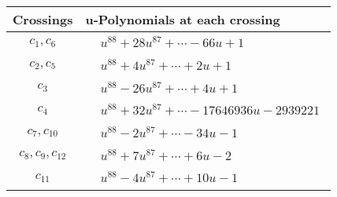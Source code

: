 \documentclass[1p]{elsarticle_modified}
\theoremstyle{definition}
\begin{document}
\begin{tabular}{m{50pt}|m{274pt}}
Crossings & \hspace{64pt}u-Polynomials at each crossing \\
\hline $$\begin{aligned}c_{1},c_{6}\end{aligned}$$&$\begin{aligned}
&u^{88}+28 u^{87}+\cdots-66 u+1
\end{aligned}$\\
\hline $$\begin{aligned}c_{2},c_{5}\end{aligned}$$&$\begin{aligned}
&u^{88}+4 u^{87}+\cdots+2 u+1
\end{aligned}$\\
\hline $$\begin{aligned}c_{3}\end{aligned}$$&$\begin{aligned}
&u^{88}-26 u^{87}+\cdots+4 u+1
\end{aligned}$\\
\hline $$\begin{aligned}c_{4}\end{aligned}$$&$\begin{aligned}
&u^{88}+32 u^{87}+\cdots-17646936 u-2939221
\end{aligned}$\\
\hline $$\begin{aligned}c_{7},c_{10}\end{aligned}$$&$\begin{aligned}
&u^{88}-2 u^{87}+\cdots-34 u-1
\end{aligned}$\\
\hline $$\begin{aligned}c_{8},c_{9},c_{12}\end{aligned}$$&$\begin{aligned}
&u^{88}+7 u^{87}+\cdots+6 u-2
\end{aligned}$\\
\hline $$\begin{aligned}c_{11}\end{aligned}$$&$\begin{aligned}
&u^{88}-4 u^{87}+\cdots+10 u-1
\end{aligned}$\\
\hline
\end{tabular}\\~\\
\newpage\renewcommand{\arraystretch}{1}
\end{document}

